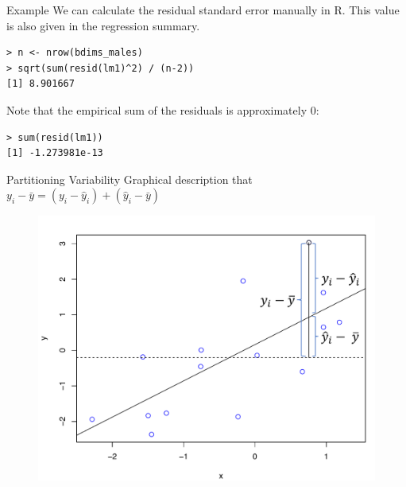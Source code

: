 \documentclass[10pt]{beamer}
\begin{document}


\begin{frame}[fragile]{Example}
We can calculate the residual standard error manually in R. This value is also given in the regression summary. 
\small
\begin{verbatim}
> n <- nrow(bdims_males)
> sqrt(sum(resid(lm1)^2) / (n-2))
[1] 8.901667
\end{verbatim}
\vspace{10pt}

\normalsize
Note that the empirical sum of the residuals is approximately 0:
\small
\begin{verbatim}
> sum(resid(lm1))
[1] -1.273981e-13
\end{verbatim}
\end{frame}


\begin{frame}{Partitioning Variability}
Graphical description that $y_i - \bar{y} = (y_i - \hat{y}_i) + (\hat{y}_i - \bar{y})$

\begin{figure}
\includegraphics[scale=0.4]{figure/partition_variance2.pdf}
\end{figure}
\end{frame}
\end{document}
